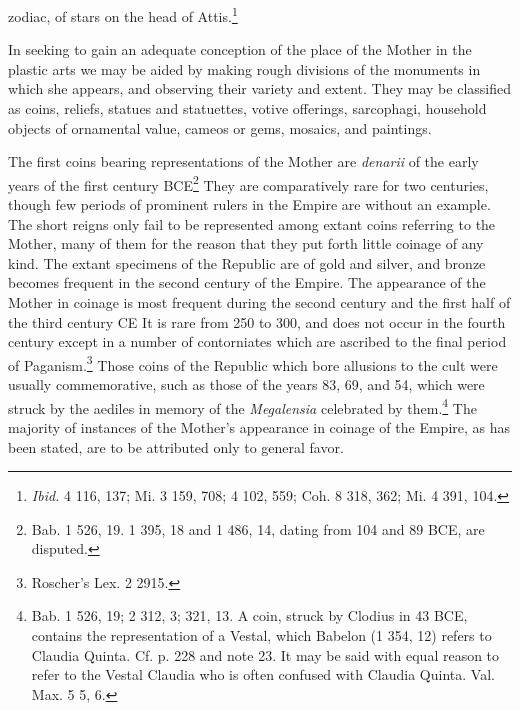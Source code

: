 \documentclass[a4paper, 11pt, oneside, polutonikogreek, french]{article}
\begin{document}
zodiac, of stars on the head of Attis.\footnote{\emph{Ibid.} 4 116, 137; Mi. 3 159, 708; 4 102, 559; Coh. 8 318, 362; Mi. 4 391, 104.}

In seeking to gain an adequate conception of the place of the Mother in the plastic arts we may be aided by making rough divisions of the monuments in which she appears, and observing their variety and extent. They may be classified as coins, reliefs, statues and statuettes, votive offerings, sarcophagi, household objects of ornamental value, cameos or gems, mosaics, and paintings.

The first coins bearing representations of the Mother are \emph{denarii} of the early years of the first century \textsc{BCE}\footnote{Bab. 1 526, 19. 1 395, 18 and 1 486, 14, dating from 104 and 89 \textsc{BCE}, are disputed.} They are comparatively rare for two centuries, though few periods of prominent rulers in the Empire are without an example. The short reigns only fail to be represented among extant coins referring to the Mother, many of them for the reason that they put forth little coinage of any kind. The extant specimens of the Republic are of gold and silver, and bronze becomes frequent in the second century of the Empire. The appearance of the Mother in coinage is most frequent during the second century and the first half of the third century \textsc{CE} It is rare from 250 to 300, and does not occur in the fourth century except in a number of contorniates which are ascribed to the final period of Paganism.\footnote{Roscher's Lex. 2 2915.} Those coins of the Republic which bore allusions to the cult were usually commemorative, such as those of the years 83, 69, and 54, which were struck by the aediles in memory of the \emph{Megalensia} celebrated by them.\footnote{Bab. 1 526, 19; 2 312, 3; 321, 13. A coin, struck by Clodius in 43 \textsc{BCE}, contains the representation of a Vestal, which Babelon (1 354, 12) refers to Claudia Quinta. Cf. p. 228 and note 23. It may be said with equal reason to refer to the Vestal Claudia who is often confused with Claudia Quinta. Val. Max. 5 5, 6.} The majority of instances of the Mother's appearance in coinage of the Empire, as has been stated, are to be attributed only to general favor.
\end{document}
